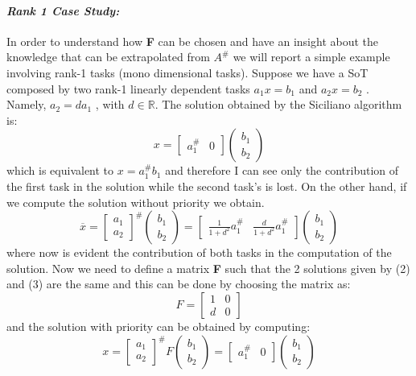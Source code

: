 \documentclass[11pt,a4paper, twocolumn, twoside]{article}
\newcommand{\R}{\mathbb{R}}
\begin{document}
\paragraph{\textit{Rank 1 Case Study:}}
In order to understand how \textbf{F} can be chosen and have an insight about the knowledge that can be extrapolated from $A^\#$  we will report a simple example involving rank-1 tasks (mono dimensional tasks).
Suppose we have a SoT composed by two rank-1 linearly dependent tasks $a_1x = b_1$ and $a_2x = b_2$ . Namely, $a_2 = da_1$ , with $d \in \R$.
The solution obtained by the Siciliano algorithm is:\[
x=\begin{bmatrix}
a_1^\# & 0 
\end{bmatrix}
\begin{pmatrix}
b_1 \\ b_2
\end{pmatrix}
\]
which is equivalent to $x = a_1^\#b_1$ and therefore I can see only the contribution of the first task in the solution while the second task’s is lost.
On the other hand, if we compute the solution without priority we obtain.
\[
\overline{x} = 
\begin{bmatrix}
a_1 \\ a_2
\end{bmatrix}^\#
\begin{pmatrix}
b_1 \\ b_2
\end{pmatrix} = 
\begin{bmatrix}
\frac{1}{1+d^2}a_1^\# & \frac{d}{1+d^2}a_1^\#
\end{bmatrix}
\begin{pmatrix}
b_1 \\ b_2
\end{pmatrix}
\]
where now is evident the contribution of both tasks in the computation of the solution.
Now we need to define a matrix \textbf{F}  such that the 2 solutions given by (2) and (3) are the same and this can be done by choosing the matrix as:
\[
F = \begin{bmatrix}
1 & 0 \\ d & 0
\end{bmatrix}
\]
and the solution with priority can be obtained by computing:
\[
x = 
\begin{bmatrix}
a_1 \\ a_2
\end{bmatrix}^\#F
\begin{pmatrix}
b_1 \\ b_2
\end{pmatrix}
=\begin{bmatrix}
a_1^\# & 0 
\end{bmatrix}
\begin{pmatrix}
b_1 \\ b_2
\end{pmatrix}
\]
\end{document}
